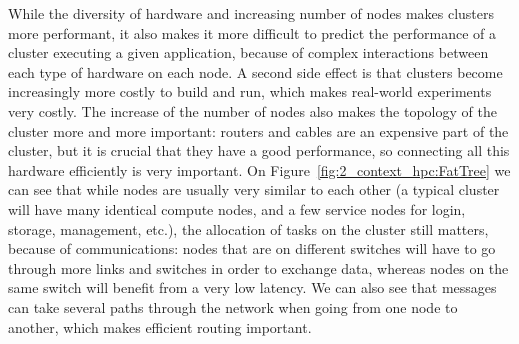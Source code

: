 While the diversity of hardware and increasing number of nodes makes clusters
more performant, it also makes it more difficult to predict the performance of a
cluster executing a given application, because of complex interactions between
each type of hardware on each node. A second side effect is that clusters become
increasingly more costly to build and run, which makes real-world experiments
very costly. The increase of the number of nodes also makes the topology of the
cluster more and more important: routers and cables are an expensive part of the
cluster, but it is crucial that they have a good performance, so connecting all
this hardware efficiently is very important. On
Figure~\ref{fig:2_context_hpc:FatTree} we can see that while nodes are usually
very similar to each other (a typical cluster will have many identical compute
nodes, and a few service nodes for login, storage, management, etc.), the
allocation of tasks on the cluster still matters, because of communications:
nodes that are on different switches will have to go through more links and
switches in order to exchange data, whereas nodes on the same switch will
benefit from a very low latency. We can also see that messages can take several
paths through the network when going from one node to another, which makes
efficient routing important.

